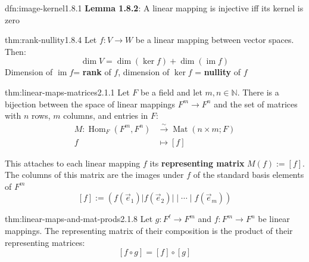 \documentclass[landscape, 8pt]{extarticle}
\DeclareMathOperator{\im}{im}
\DeclareMathOperator{\Mat}{Mat}
\DeclareMathOperator{\Hom}{Hom}
\begin{document}
\begin{multicols}{3}

\begin{dfn}{dfn:image-kernel}{1.8.1}
    \textbf{Lemma 1.8.2}: A linear mapping is injective iff its kernel is zero
\end{dfn}

\vspace{-5pt}

\begin{thm}{thm:rank-nullity}{1.8.4}
    Let $f : V \to W$ be a linear mapping between vector spaces. Then:
    \[\dim V = \dim(\ker f) + \dim (\im f)\]
    Dimension of $\im f$= \textbf{rank} of $f$, dimension of $\ker f$ = \textbf{nullity} of $f$
\end{thm}

\begin{thm}{thm:linear-maps-matrices}{2.1.1}
    Let $F$ be a field and let $m,n\in \mathbb{N}$. There is a bijection between the space of linear mappings $F^{m}\to F^{n}$ and the set of matrices with $n$ rows, $m$ columns, and entries in $F$:
    \begin{align*}
        M : \Hom_{F}(F^{m}, F^{n}) &\xrightarrow{\sim} \Mat(n \times m; F)\\
        f &\mapsto [f]
    \end{align*}

    This attaches to each linear mapping $f$ its \textbf{representing matrix} $M(f) := [f]$. The columns of this matrix are the images under $f$ of the standard basis elements of $F^{m}$
    \[[f] := (f(\vec{e}_{1}) \lvert f(\vec{e}_{2}) \rvert \mid \cdots \mid f(\vec{e}_{m}))\]
\end{thm}



\begin{thm}{thm:linear-maps-and-mat-prods}{2.1.8}
    Let $g : F^{\ell}\to F^{m}$ and $f : F^{m} \to F^{n}$ be linear mappings. The representing matrix of their composition is the product of their representing matrices:
    \[[f \circ g] = [f] \circ [g]\]
    

\end{thm}
\end{multicols}
\end{document}

